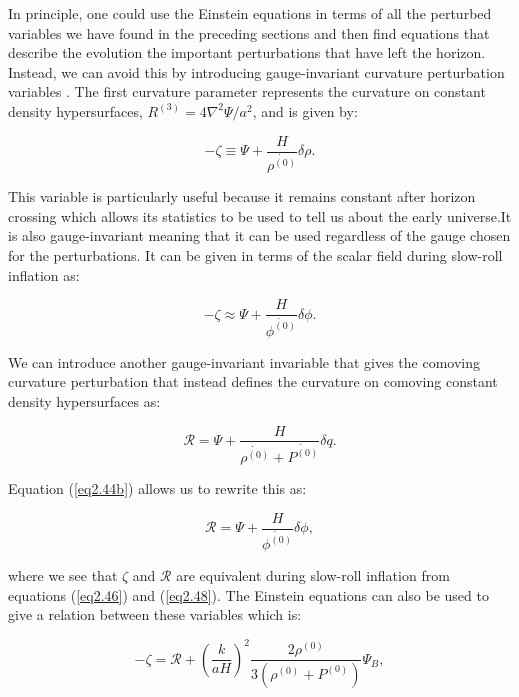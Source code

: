\documentclass[a4paper,12pt,twoside]{report}
\begin{document}
In principle, one could use the Einstein equations in terms of all the perturbed variables we have found in the preceding sections and then find equations that describe the evolution the important perturbations that have left the horizon. Instead, we can avoid this by introducing gauge-invariant curvature perturbation variables \cite{Bardeen:1983qw, Weinberg:2008zzc, Langlois:2004de}. The first curvature parameter represents the curvature on constant density hypersurfaces, $R^{(3)} = 4 \nabla^{2}\Psi / a^{2}$, and is given by:

\begin{equation} \label{eq2.45}
-\zeta \equiv \Psi + \frac{H}{\dot{\rho^{(0)}}} \delta \rho.
\end{equation}

This variable is particularly useful because it remains constant after horizon crossing which allows its statistics to be used to tell us about the early universe.It is also gauge-invariant meaning that it can be used regardless of the gauge chosen for the perturbations. It can be given in terms of the scalar field during slow-roll inflation as:

\begin{equation} \label{eq2.46}
-\zeta \approx \Psi + \frac{H}{\dot{\phi^{(0)}}} \delta \phi.
\end{equation}

We can introduce another gauge-invariant invariable that gives the comoving curvature perturbation that instead defines the curvature on comoving constant density hypersurfaces as:

\begin{equation} \label{eq2.47}
\mathcal{R} = \Psi + \frac{H}{ \dot{\rho^{(0)}} + \dot{P^{(0)}} } \delta q .
\end{equation}

Equation (\ref{eq2.44b}) allows us to rewrite this as:

\begin{equation} \label{eq2.48}
\mathcal{R} = \Psi + \frac{H}{\dot{\phi^{(0)}}} \delta \phi, 
\end{equation}

where we see that $\zeta$ and $\mathcal{R}$ are equivalent during slow-roll inflation from equations (\ref{eq2.46}) and (\ref{eq2.48}). The Einstein equations can also be used to give a relation between these variables which is:

\begin{equation} \label{eq2.49}
-\zeta = \mathcal{R} + \left( \frac{k}{aH} \right)^{2} \frac{2 \rho^{(0)}}{3( \rho^{(0)} + P^{(0)})} \Psi_{B},
\end{equation}
\end{document}

